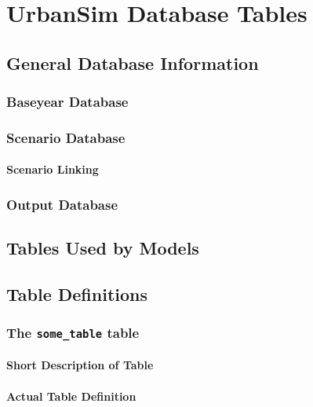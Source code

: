 
\chapter{UrbanSim Database Tables}
\label{chapter:urbansim-database-tables}

\section{General Database Information}
\subsection{Baseyear Database}
\subsection{Scenario Database}
\subsubsection{Scenario Linking}
\subsection{Output Database}
\section{Tables Used by Models}
\section{Table Definitions}
\subsection{The {\tt some_table} table}
\subsubsection{Short Description of Table}
\subsubsection{Actual Table Definition}
